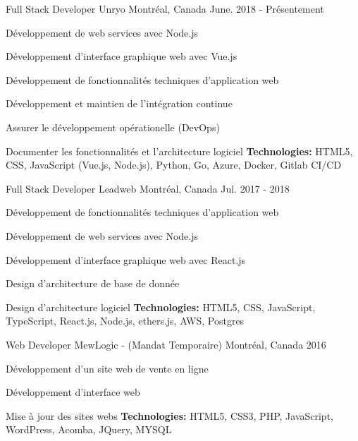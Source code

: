 \begin{cventries}
  \cventry
    {Full Stack Developer}
    {Unryo}
    {Montréal, Canada}
    {June. 2018 - Présentement}
    {
      \begin{cvitems}
        \item {Développement de web services avec Node.js}
        \item {Développement d'interface graphique web avec Vue.js}
        \item {Développement de fonctionnalités techniques d'application web}
        \item {Développement et maintien de l'intégration continue}
        \item {Assurer le développement opérationelle (DevOps)}
        \item {Documenter les fonctionnalités et l'architecture logiciel}
        \newline
        \vspace{3mm}
        \textbf{Technologies: }{HTML5, CSS, JavaScript (Vue.js, Node.js), Python, Go, Azure, Docker, Gitlab CI/CD}
      \end{cvitems}
    }
  \cventry
    {Full Stack Developer}
    {Leadweb}
    {Montréal, Canada}
    {Jul. 2017 - 2018}
    {
      \begin{cvitems}
        \item {Développement de fonctionnalités techniques d'application web}
        \item {Développement de web services avec Node.js}
        \item {Développement d'interface graphique web avec React.js}
        \item {Design d'architecture de base de donnée}
        \item {Design d'architecture logiciel}
        \newline
        \vspace{3mm}
        \textbf{Technologies: }{ HTML5, CSS, JavaScript, TypeScript, React.js, Node.js, ethers.js, AWS, Postgres }
      \end{cvitems}
    }

  \cventry
    {Web Developer}
    {MewLogic - (Mandat Temporaire)}
    {Montréal, Canada}
    {2016}
    {
      \begin{cvitems}
        \item {Développement d'un site web de vente en ligne}
        \item {Développement d’interface web}
        \item {Mise à jour des sites webs}
        \newline
        \vspace{3mm}
        \textbf{Technologies: }{ HTML5, CSS3, PHP, JavaScript,  WordPress, Acomba, JQuery, MYSQL }
      \end{cvitems}
    }
    \vspace{3mm}
    

\end{cventries}
